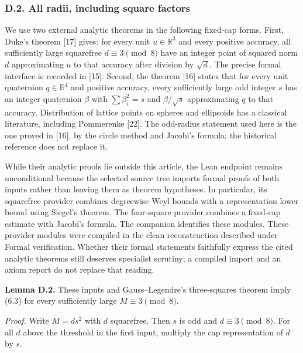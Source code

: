 \documentclass[english,11pt,a4paper]{article}
\begin{document}
\subsubsection{D.2. All radii, including square factors}\label{d.2.-all-radii-including-square-factors}

We use two external analytic theorems in the following fixed-cap forms. First, Duke's theorem {[}17{]} gives: for every unit \(u\in\mathbb R^3\) and every positive accuracy, all sufficiently large squarefree \(d\equiv3\pmod8\) have an integer point of squared norm \(d\) approximating \(u\) to that accuracy after division by \(\sqrt d\). The precise formal interface is recorded in {[}15{]}. Second, the theorem {[}16{]} states that for every unit quaternion \(q\in\mathbb R^4\) and positive accuracy, every sufficiently large odd integer \(s\) has an integer quaternion \(\beta\) with \(\sum\beta_i^2=s\) and \(\beta/\sqrt s\) approximating \(q\) to that accuracy. Distribution of lattice points on spheres and ellipsoids has a classical literature, including Pommerenke {[}22{]}. The odd-radius statement used here is the one proved in {[}16{]}, by the circle method and Jacobi's formula; the historical reference does not replace it.

While their analytic proofs lie outside this article, the Lean endpoint remains unconditional because the selected source tree imports formal proofs of both inputs rather than leaving them as theorem hypotheses. In particular, its squarefree provider combines degreewise Weyl bounds with a representation lower bound using Siegel's theorem. The four-square provider combines a fixed-cap estimate with Jacobi's formula. The companion identifies these modules. These provider modules were compiled in the clean reconstruction described under Formal verification. Whether their formal statements faithfully express the cited analytic theorems still deserves specialist scrutiny; a compiled import and an axiom report do not replace that reading.

\textbf{Lemma D.2.} These inputs and Gauss--Legendre's three-squares theorem imply (6.3) for every sufficiently large \(M\equiv3\pmod8\).

\emph{Proof.} Write \(M=ds^2\) with \(d\) squarefree. Then \(s\) is odd and \(d\equiv3\pmod8\). For all \(d\) above the threshold in the first input, multiply the cap representation of \(d\) by \(s\).
\end{document}
